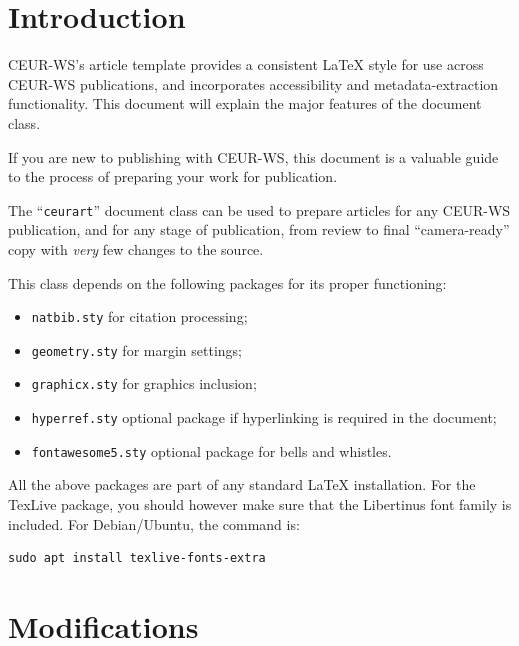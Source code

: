 \documentclass[%
hf
]{ceurart}
\begin{document}
\maketitle

\section{Introduction}

CEUR-WS's article template provides a consistent \LaTeX{} style for use across CEUR-WS publications, and incorporates accessibility and metadata-extraction functionality.
This document will explain the major features of the document class.

If you are new to publishing with CEUR-WS, this document is a valuable guide to the process of preparing your work for publication.

The ``\verb|ceurart|'' document class can be used to prepare articles for any CEUR-WS publication, and for any stage of publication, from review to final ``camera-ready'' copy with {\itshape very} few changes to the source.

This class depends on the following packages for its proper functioning:

\begin{itemize}
\item
\texttt{natbib.sty}
 for citation processing;
\item
\texttt{geometry.sty}
 for margin settings;
\item
\texttt{graphicx.sty}
 for graphics inclusion;
\item
\texttt{hyperref.sty}
 optional package if hyperlinking is required in the document;
\item
\texttt{fontawesome5.sty}
 optional package for bells and whistles.
\end{itemize}

All the above packages are part of any standard \LaTeX{} installation.
For the TexLive package, you should however make sure that the Libertinus font family is included.
For Debian/Ubuntu, the command is:
\begin{verbatim}
sudo apt install texlive-fonts-extra
\end{verbatim}

\section{Modifications}
\end{document}
